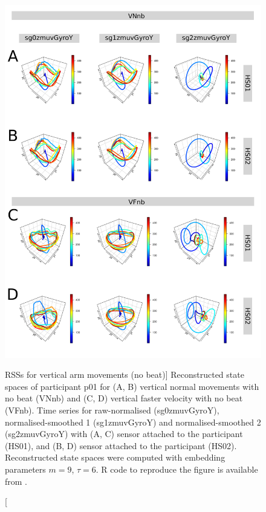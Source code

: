 \begin{figure}
\centering
\includegraphics[height=0.8\textheight]{rss_Vnb_w500}
\caption
	[RSSs for vertical arm movements (no beat)]{
	Reconstructed state spaces of participant p01 for 
	(A, B) vertical normal movements with no beat (VNnb) and 
	(C, D) vertical faster velocity with no beat (VFnb).
	Time series for raw-normalised (sg0zmuvGyroY), 
	normalised-smoothed 1 (sg1zmuvGyroY) and 
	normalised-smoothed 2 (sg2zmuvGyroY) with
	(A, C) sensor attached to the participant (HS01), and
	(B, D) sensor attached to the participant (HS02).	
	Reconstructed state spaces were computed with 
	embedding parameters $m=9$, $\tau=6$.
	R code to reproduce the figure is available from \cite{hwum2018}.
        }
     \label{fig:rss_Vnb_w500}
\end{figure}

